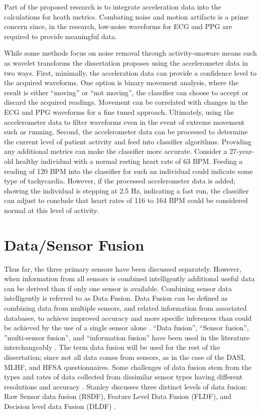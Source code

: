Part of the proposed research is to integrate acceleration data into the calculations for heath metrics. Combating noise and motion artifacts is a prime concern since, in the research, low-noise waveforms for ECG and PPG are required to provide meaningful data.

While some methods focus on noise removal through activity-unaware means such as wavelet transforms \cite{Liu2011} the dissertation proposes using the accelerometer data in two ways. First, minimally, the acceleration data can provide a confidence level to the acquired waveforms. One option is binary movement analysis, where the result is either “moving” or “not moving”, the classifier can choose to accept or discard the acquired readings. Movement can be correlated with changes in the ECG and PPG waveforms for a fine tuned approach. Ultimately, using the accelerometer data to filter waveforms even in the event of extreme movement such as running. Second, the accelerometer data can be processed to determine the current level of patient activity and feed into classifier algorithms. Providing any additional metrics can make the classifier more accurate. Consider a 27-year-old healthy individual with a normal resting heart rate of 63 BPM. Feeding a reading of 120 BPM into the classifier for such an individual could indicate some type of tachycardia. However, if the processed accelerometer data is added; showing the individual is stepping at 2.5 Hz, indicating a fast run, the classifier can adjust to conclude that heart rates of 116 to 164 BPM could be considered normal at this level of activity.

\section{Data/Sensor Fusion}
\label{sec:DataFusion}
Thus far, the three primary sensors have been discussed separately. However, when information from all sensors is combined intelligently additional useful data can be derived than if only one sensor is available.  Combining sensor data intelligently is referred to as Data Fusion. Data Fusion can be defined as combining data from multiple sensors, and related information from associated databases, to achieve improved accuracy and more specific inferences than could be achieved by the use of a single sensor alone \cite{Hall1997}.  “Data fusion”, “Sensor fusion”,  ”multi-sensor fusion”, and “information fusion” have been used in the literature interchangeably \cite{Crowley1993,Ceruti2006,Dantu2006,Dong2006,Durrant-Whyte2005,Qi2001,Stanley2007,Wu2002}. The term data fusion will be used for the rest of the dissertation; since not all data comes from sensors, as in the case of the DASI, MLHF, and HFSA questionnaires.  Some challenges of data fusion stem from the types and rates of data collected from dissimilar sensor types having different resolutions and accuracy \cite{Wu2002}.  Stanley discusses three distinct levels of data fusion: Raw Sensor data fusion (RSDF), Feature Level Data Fusion (FLDF), and Decision level data Fusion (DLDF) \cite{Stanley2007}.  

